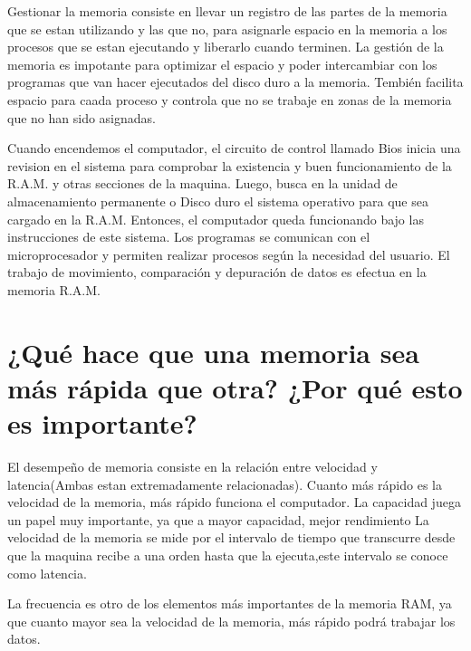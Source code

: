 \documentclass{article}
\begin{document}
Gestionar la memoria consiste en llevar un registro de las partes de la memoria que se estan utilizando y las que no, para asignarle espacio en la memoria a los procesos que se estan ejecutando y liberarlo cuando terminen.
La gestión de la memoria es impotante para optimizar el espacio y poder intercambiar con los programas que van hacer ejecutados del disco duro a la memoria. Tembién facilita espacio para caada proceso y controla que no se trabaje en zonas de la memoria que no han sido asignadas.

\vspace{0.5cm}

Cuando encendemos el computador, el circuito de control llamado Bios inicia una revision en el sistema para comprobar la existencia y buen funcionamiento de la R.A.M. y otras secciones de la maquina. Luego, busca en la unidad de almacenamiento permanente o Disco duro el sistema operativo para que sea cargado en la R.A.M. Entonces, el computador queda funcionando bajo las instrucciones de este sistema.
Los programas se comunican con el microprocesador y permiten realizar procesos según la necesidad del usuario. El trabajo de movimiento, comparación y depuración de datos es efectua en la memoria R.A.M. \cite{3website}

\section{¿Qué hace que una memoria sea más rápida que otra? ¿Por qué esto es importante?} \label{contenido}

El desempeño de memoria consiste en la relación entre velocidad y latencia(Ambas estan extremadamente relacionadas). Cuanto más rápido es la velocidad de la memoria, más rápido funciona el computador.
La capacidad juega un papel muy importante, ya que a mayor capacidad, mejor rendimiento
La velocidad de la memoria se mide por el intervalo de tiempo que transcurre desde que la maquina recibe a una orden hasta que la ejecuta,este intervalo se conoce como latencia.

La frecuencia es otro de los elementos más importantes de la memoria RAM, ya que cuanto mayor sea la velocidad de la memoria, más rápido podrá trabajar los datos.

\newpage






\citep{Programación}
\end{document}
